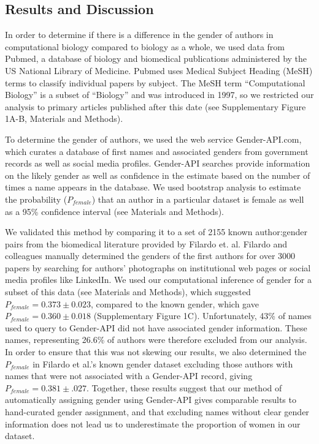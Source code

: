\documentclass[10pt,letterpaper]{article}
\begin{document}
\begin{flushleft}
\section*{Results and Discussion}
In order to determine if there is a difference in the gender of authors in computational biology compared to biology as a whole, we used data from Pubmed, a database of biology and biomedical publications administered by the US National Library of Medicine. Pubmed uses Medical Subject Heading (MeSH) terms to classify individual papers by subject. The MeSH term “Computational Biology” is a subset of “Biology” and was introduced in 1997, so we restricted our analysis to primary articles published after this date (see Supplementary Figure 1A-B, Materials and Methods).

To determine the gender of authors, we used the web service Gender-API.com, which curates a database of first names and associated genders from government records as well as social media profiles. Gender-API searches provide information on the likely gender as well as confidence in the estimate based on the number of times a name appears in the database. We used bootstrap analysis to estimate the probability ($P_{female}$) that an author in a particular dataset is female as well as a 95\% confidence interval (see Materials and Methods).

We validated this method by comparing it to a set of 2155 known author:gender pairs from the biomedical literature provided by Filardo et. al. \cite{Filardo2016} Filardo and colleagues manually determined the genders of the first authors for over 3000 papers by searching for authors’ photographs on institutional web pages or social media profiles like LinkedIn. We used our computational inference of gender for a subset of this data (see Materials and Methods), which suggested $P_{female} = 0.373 \pm 0.023$, compared to the known gender, which gave $P_{female} = 0.360 \pm 0.018$ (Supplementary Figure 1C). Unfortunately, 43\% of names used to query to Gender-API did not have associated gender information. These names, representing 26.6\% of authors were therefore excluded from our analysis. In order to ensure that this was not skewing our results, we also determined the $P_{female}$ in Filardo et al.'s known gender dataset excluding those authors with names that were not associated with a Gender-API record, giving $P_{female} = 0.381 \pm .027$. Together, these results suggest that our method of automatically assigning gender using Gender-API gives comparable results to hand-curated gender assignment, and that excluding names without clear gender information does not lead us to underestimate the proportion of women in our dataset.


\end{flushleft}
\end{document}
